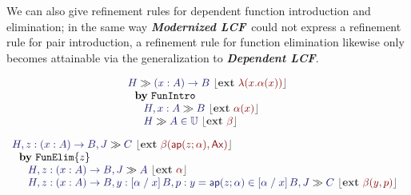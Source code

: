 \documentclass[11pt]{article}
\theoremstyle{definition}
\theoremstyle{remark}
\numberwithin{equation}{section}
\def\IModeColorName{MidnightBlue}
\def\OModeColorName{Maroon}
\newcommand\IMode[1]{{\color{\IModeColorName}{#1}}}
\newcommand\OMode[1]{{\color{\OModeColorName}{#1}}}
\newcommand\MemberUnmoded[2]{#1\in #2}
\newcommand\EqMemberUnmoded[3]{#1 = #2\in #3}
\newcommand\DFunIntroRule{\mathtt{FunIntro}}
\newcommand\DFunElimRule[1]{\mathtt{FunElim}\{#1\}}
\newcommand\TyDFun[3]{(#2:#1) \to #3}
\newcommand\Lam[2]{\lambda(#1.#2)}
\newcommand\Ap[2]{\mathsf{ap}(#1;#2)}
\newcommand\Ax{\mathsf{Ax}}
\newcommand\TyUniv{\mathbb{U}}
\newcommand\Subst[3]{\left[#1\;/\;#2\right]#3}
\newcommand\ModLCF{\textbf{\emph{Modernized LCF}}}
\newcommand\DepLCF{\textbf{\emph{Dependent LCF}}}
\newcommand\Seq[2]{#1 \gg #2}
\newcommand\Ext[1]{{\color{dark-gray}\left\lfloor\mathbf{ext}\ \OMode{#1}\right\rfloor}}
\newcommand\SeqExt[3]{
  \Seq{\IMode{#1}}{\IMode{#2}}\ \Ext{#3}
}
\newcommand\NuprlRule[3]{%
  \begin{array}{l}%
    #2\\
    \ \ \mathbf{by}\ #1\\
    \quad #3
  \end{array}%
}
\begin{document}
We can also give refinement rules for dependent function introduction and
elimination; in the same way \ModLCF\ could not express a refinement rule for
pair introduction, a refinement rule for function elimination likewise only
becomes attainable via the generalization to \DepLCF.

\begin{gather*}
  \NuprlRule{\DFunIntroRule}{
    \SeqExt{H}{\TyDFun{A}{x}{B}}{\Lam{x}{\alpha(x)}}
  }{
    \begin{array}{l}
      \SeqExt{H,x:A}{B}{\alpha(x)}\\
      \SeqExt{H}{\MemberUnmoded{A}{\TyUniv}}{\beta}
    \end{array}
  }\\[6pt]
  \NuprlRule{\DFunElimRule{z}}{
    \SeqExt{
      H,z:\TyDFun{A}{x}{B},J
    }{C}{
      \beta(\Ap{z}{\alpha}, \Ax)
    }
  }{
    \begin{array}{l}
      \SeqExt{H,z:\TyDFun{A}{x}{B}, J}{A}{\alpha}\\
      \SeqExt{
        H,z:\TyDFun{A}{x}{B},%
        y:\Subst{\alpha}{x}{B},%
        p:\EqMemberUnmoded{y}{\Ap{z}{\alpha}}{\Subst{\alpha}{x}{B}}, J
      }{C}{
        \beta(y,p)
      }
    \end{array}
  }
\end{gather*}
\end{document}
